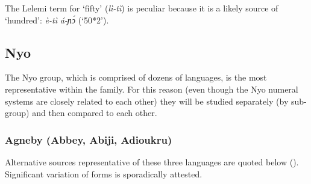 The Lelemi term for ‘fifty’ (\textit{lì-tì}) is peculiar because it is a likely source of ‘hundred’: \textit{è-tì} \textit{á-ɲ{\'{ɔ}}} (‘50*2’). 

\clearpage
\subsection{Nyo}%
The Nyo group, which is comprised of dozens of languages, is the most representative within the family. For this reason (even though the Nyo numeral systems are closely related to each other) they will be studied separately (by sub-group) and then compared to each other. 

\subsubsection{Agneby (Abbey, Abiji, Adioukru)}%
Alternative sources representative of these three languages are quoted below (). Significant variation of forms is sporadically attested.

